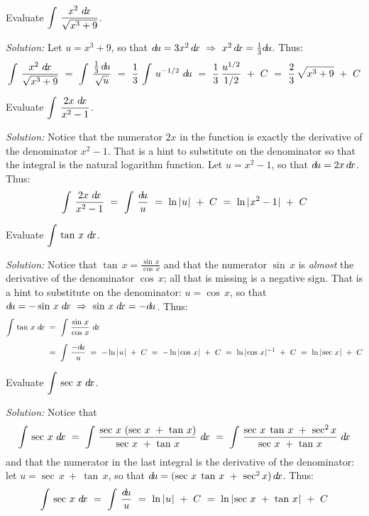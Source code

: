 \divider
\newpage
\begin{exmp}\label{exmp:subst6}
\noindent Evaluate $\displaystyle\int\,\dfrac{x^2~d\!x}{\sqrt{x^3 + 9}}$.\vspace{1mm}
\par\noindent\emph{Solution:} Let $u = x^3 + 9$, so that $d\!u = 3x^2\,d\!x
~\Rightarrow~ x^2\,d\!x = \frac{1}{3}d\!u$. Thus:
\[
\int\,\dfrac{x^2~d\!x}{\sqrt{x^3 + 9}} ~=~ \int\,\dfrac{\frac{1}{3}\,d\!u}{\sqrt{u}} ~=~ 
\frac{1}{3}\,\int\,u^{-1/2}~d\!u ~=~ \frac{1}{3}\,\frac{u^{1/2}}{1/2} ~+~ C ~=~
\frac{2}{3}\,\sqrt{x^3 + 9} ~+~ C
\]
\end{exmp}
\begin{exmp}\label{exmp:subst7}
\noindent Evaluate $\displaystyle\int\,\dfrac{2x~d\!x}{x^2 - 1}$.\vspace{1mm}
\par\noindent\emph{Solution:} Notice that the numerator $2x$ in the function is
exactly the derivative of the denominator $x^2 - 1$. That is a hint to
substitute on the denominator so that the integral is the natural logarithm
function. Let $u = x^2 - 1$, so that $d\!u = 2x\,d\!x$. Thus:
\[
\int\,\dfrac{2x~d\!x}{x^2 - 1} ~=~ \int\,\dfrac{d\!u}{u} ~=~ \ln\,\lvert\mspace{1mu}u\mspace{1mu}\rvert ~+~ C
~=~ \ln\,\lvert\mspace{1mu}x^2 - 1\mspace{1mu}\rvert ~+~ C
\]
\end{exmp}
\begin{exmp}\label{exmp:subst8}
\noindent Evaluate $\displaystyle\int\,\tan\,x~d\!x$.\vspace{1mm}
\par\noindent\emph{Solution:} Notice that $\tan\,x = \frac{\sin\,x}{\cos\,x}$
and that the numerator $\sin\,x$ is \emph{almost} the derivative of the
denominator $\cos\,x$; all that is missing is a negative sign. That is a hint to
substitute on the denominator: $u = \cos\,x$, so that
$d\!u = -\sin\,x\;d\!x ~\Rightarrow~ \sin\,x\;d\!x = -d\!u$. Thus:
\begin{align*}
\int\,\tan\,x~d\!x ~&=~ \int\,\frac{\sin\,x}{\cos\,x}~d\!x\\[6pt]
&=~
\int\,\frac{-d\!u}{u} ~=~ -\ln\,\lvert\mspace{1mu}u\mspace{1mu}\rvert ~+~ C ~=~ -\ln\,\lvert\mspace{1mu}\cos\,x\mspace{1mu}\rvert ~+~ C
~=~ \ln\,\lvert\mspace{1mu}\cos\,x\mspace{1mu}\rvert^{-1} ~+~ C ~=~ \ln\,\lvert\mspace{1mu}\sec\,x\mspace{1mu}\rvert ~+~ C
\end{align*}
\end{exmp}
\begin{exmp}\label{exmp:subst9}
\noindent Evaluate $\displaystyle\int\,\sec\,x~d\!x$.\vspace{1mm}
\par\noindent\emph{Solution:} Notice that
\[
\int\,\sec\,x~d\!x ~=~ \int\,\frac{\sec\,x~(\sec\,x ~+~ \tan\,x)}{\sec\,x ~+~ \tan\,x}~d\!x
~=~ \int\,\frac{\sec\,x\;\tan\,x ~+~ \sec^2 x}{\sec\,x ~+~ \tan\,x}~d\!x
\]
and that the numerator in the last integral is the derivative of the
denominator: let $u = \sec\,x ~+~ \tan\,x$, so that
$d\!u = (\sec\,x\;\tan\,x ~+~ \sec^2 x)\,d\!x$. Thus:
\[
\int\,\sec\,x~d\!x ~=~ \int\,\frac{d\!u}{u} ~=~ \ln\,\lvert\mspace{1mu}u\mspace{1mu}\rvert ~+~ C ~=~
\ln\,\lvert\mspace{1mu}\sec\,x ~+~ \tan\,x\mspace{1mu}\rvert ~+~ C
\]
\end{exmp}
\divider
\vspace{3mm}

